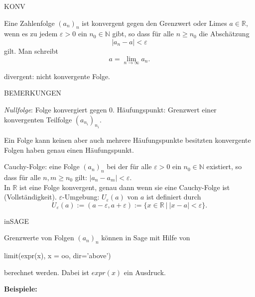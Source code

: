 \documentclass[fontsize=12pt,paper=a4,twoside,bibtotoc,idxtotoc,
liststotoc,pagesize,BCOR1.2cm,DIV15,chapterprefix,pagesize=pdftex]{scrbook}
\theoremstyle{plain}
\theoremstyle{definition}
\theoremstyle{remark}
\begin{document}
KONV

Eine Zahlenfolge $(a_n)_n$ ist {\color{red} konvergent} gegen den {\color{red}
Grenzwert} oder {\color{red} Limes} $a\in \mathbb{R}$, wenn es zu jedem
$\varepsilon >0$ ein $n_0 \in \mathbb{N}$ gibt, so dass für alle $n \geq
n_0$ die Abschätzung 
\[ |a_n - a|< \varepsilon \]
 gilt. Man schreibt
\[ a=\lim_{n \rightarrow \infty} a_n. \]

{\color{red} divergent}: nicht konvergente Folge. 

BEMERKUNGEN


 \emph{Nullfolge}: Folge konvergiert gegen $0$.
 {\color{red} Häufungspunkt}: Grenzwert einer konvergenten Teilfolge $(a_{n_i})_{n_i}$.

 Ein Folge kann keinen aber auch mehrere Häufungspunkte besitzten
 konvergente Folgen haben genau einen Häufungspunkt.

  {\color{red} Cauchy-Folge}: eine Folge $(a_n)_n$ bei der für
alle $\varepsilon>0$ ein $n_0 \in \mathbb{N}$ existiert, so dass für alle
$n,m \geq n_0$ gilt:
$|a_n - a_m| < \varepsilon$. \\
 In $\mathbb{R}$ ist eine Folge konvergent,
genau dann wenn sie eine Cauchy-Folge ist (Vollständigkeit).
 {\color{red} $\varepsilon$-Umgebung}: $U_\varepsilon(a)$ von $a$ ist
definiert durch
\[
U_\varepsilon(a) := (a-\varepsilon, a+\varepsilon) := \{ x \in \mathbb{R} \ | \ |x - a| < \varepsilon \}.
\] 


inSAGE

Grenzwerte von Folgen $(a_n)_n$ können in Sage mit Hilfe von 
\begin{sagein}
limit(expr(x), x = oo, dir='above')
\end{sagein}
berechnet werden. Dabei ist $expr(x)$ ein Ausdruck.

\textbf{Beispiele:}
\end{document}

